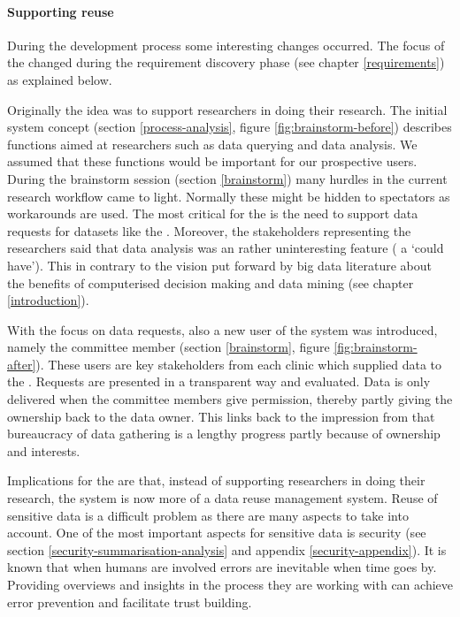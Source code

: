 \paragraph{Supporting reuse}

During the development process some interesting changes occurred.
The focus of the \ivfsystem{} changed during the requirement discovery phase (see chapter \ref{requirements}) as explained below.

Originally the idea was to support researchers in doing their research.
The initial system concept (section \ref{process-analysis}, figure \ref{fig:brainstorm-before}) describes functions aimed at researchers such as data querying and data analysis.
We assumed that these functions would be important for our prospective users.
During the brainstorm session (section \ref{brainstorm}) many hurdles in the current research workflow came to light.
Normally these might be hidden to spectators as workarounds are used.
The most critical for the \ivfsystem{} is the need to support data requests for datasets like the \projectdata{}.
Moreover, the stakeholders representing the researchers said that data analysis was an rather uninteresting feature (\ie{} a `could have').
This in contrary to the vision put forward by big data literature about the benefits of computerised decision making and data mining (see chapter \ref{introduction}).

With the focus on data requests, also a new user of the system was introduced, namely the committee member (section \ref{brainstorm}, figure \ref{fig:brainstorm-after}).
These users are key stakeholders from each clinic which supplied data to the \projectdata{}.
Requests are presented in a transparent way and evaluated.
Data is only delivered when the committee members give permission,
thereby partly giving the ownership back to the data owner.
This links back to the impression from that bureaucracy of data gathering is a lengthy progress partly because of ownership and interests.

Implications for the \ivfsystem{} are that, instead of supporting researchers in doing their research, the system is now more of a data reuse management system.
Reuse of sensitive data is a difficult problem as there are many aspects to take into account.
One of the most important aspects for sensitive data is security (see section \ref{security-summarisation-analysis} and appendix \ref{security-appendix}).
It is known that when humans are involved errors are inevitable when time goes by.
Providing overviews and insights in the process they are working with can achieve error prevention and facilitate trust building.

